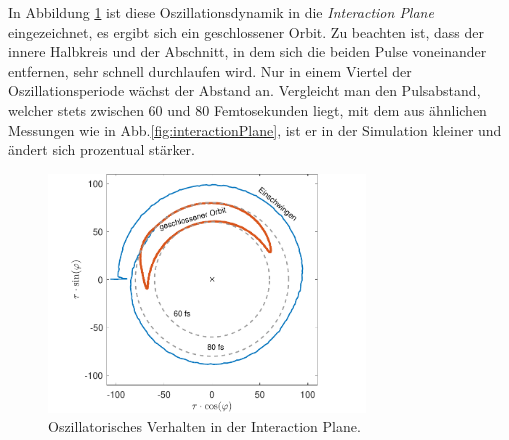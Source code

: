 \documentclass[bachelor,       %
               twoside,        %
               BCOR10mm,       %
               liststotoc,nomtotoc,bibtotoc, %
               english,ngerman, %
               final,          %
               ]{GAUBM}
\begin{document}
In Abbildung \ref{fig:SimRBOszi_IP} ist diese Oszillationsdynamik in die \textit{Interaction Plane} eingezeichnet, es ergibt sich ein geschlossener Orbit.
Zu beachten ist, dass der innere Halbkreis und der Abschnitt, in dem sich die beiden Pulse voneinander entfernen, sehr schnell durchlaufen wird.
Nur in einem Viertel der Oszillationsperiode wächst der Abstand an.
Vergleicht man den Pulsabstand, welcher stets zwischen 60 und 80 Femtosekunden liegt, mit dem aus ähnlichen Messungen wie in Abb.\ref{fig:interactionPlane}, ist er  in der Simulation kleiner und ändert sich prozentual stärker. 

\begin{figure}[!htb]
	\centering
	\includegraphics[width=0.75\textwidth]{figures/SimRB_4,6W_InteractionPlane_matlab.pdf}
	\caption{Oszillatorisches Verhalten in der Interaction Plane.}
	\label{fig:SimRBOszi_IP}
\end{figure}

\end{document}
